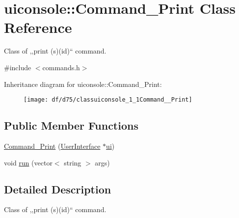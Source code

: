 \hypertarget{classuiconsole_1_1Command__Print}{
\section{uiconsole::Command\_\-Print Class Reference}
\label{df/d75/classuiconsole_1_1Command__Print}
}


Class of ,,print (s)(id)`` command.  




{\ttfamily \#include $<$commands.h$>$}

Inheritance diagram for uiconsole::Command\_\-Print:\begin{figure}[H]
\begin{center}
\leavevmode
\texttt{[image: df/d75/classuiconsole\_1\_1Command\_\_Print]}
\end{center}
\end{figure}
\subsection*{Public Member Functions}
\begin{DoxyCompactItemize}
\item 
\hyperlink{classuiconsole_1_1Command__Print_a8db0b51d3232e42e9f50f55cbc3920c3}{Command\_\-Print} (\hyperlink{classUserInterface}{UserInterface} $\ast$\hyperlink{classuiconsole_1_1Command_ab43ed5152860c099f858d62f9f556699}{ui})
\item 
void \hyperlink{classuiconsole_1_1Command__Print_a42106fe7a7b5ce0c90a5a196c5f8ff42}{run} (vector$<$ string $>$ args)
\end{DoxyCompactItemize}


\subsection{Detailed Description}
Class of ,,print (s)(id)`` command. 

